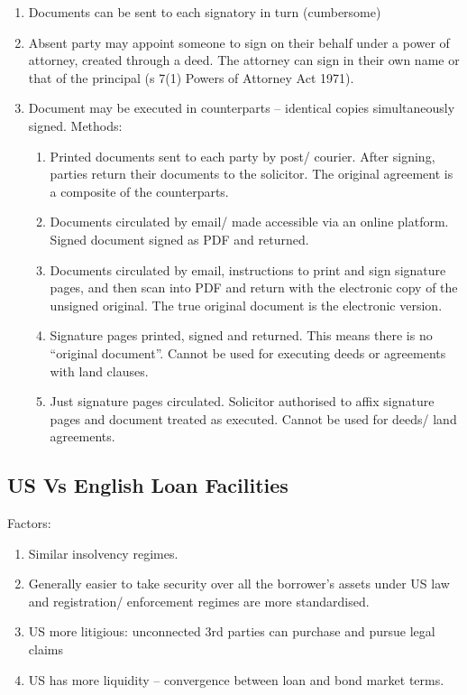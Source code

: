 \documentclass[
]{article}
\providecommand{\tightlist}{%
  \setlength{\itemsep}{0pt}\setlength{\parskip}{0pt}}
\begin{document}
\begin{enumerate}
\tightlist
\item
  Documents can be sent to each signatory in turn (cumbersome)
\item
  Absent party may appoint someone to sign on their behalf under a power
  of attorney, created through a deed. The attorney can sign in their
  own name or that of the principal (s 7(1) Powers of Attorney Act
  1971).
\item
  Document may be executed in counterparts -- identical copies
  simultaneously signed. Methods:

  \begin{enumerate}
  \tightlist
  \item
    Printed documents sent to each party by post/ courier. After
    signing, parties return their documents to the solicitor. The
    original agreement is a composite of the counterparts.
  \item
    Documents circulated by email/ made accessible via an online
    platform. Signed document signed as PDF and returned.
  \item
    Documents circulated by email, instructions to print and sign
    signature pages, and then scan into PDF and return with the
    electronic copy of the unsigned original. The true original document
    is the electronic version.
  \item
    Signature pages printed, signed and returned. This means there is no
    ``original document''. Cannot be used for executing deeds or
    agreements with land clauses.
  \item
    Just signature pages circulated. Solicitor authorised to affix
    signature pages and document treated as executed. Cannot be used for
    deeds/ land agreements.
  \end{enumerate}
\end{enumerate}

\hypertarget{us-vs-english-loan-facilities}{%
\subsection{US Vs English Loan
Facilities}\label{us-vs-english-loan-facilities}}

Factors:

\begin{enumerate}
\tightlist
\item
  Similar insolvency regimes.
\item
  Generally easier to take security over all the borrower's assets under
  US law and registration/ enforcement regimes are more standardised.
\item
  US more litigious: unconnected 3rd parties can purchase and pursue
  legal claims
\item
  US has more liquidity -- convergence between loan and bond market
  terms.
\end{enumerate}
\end{document}
